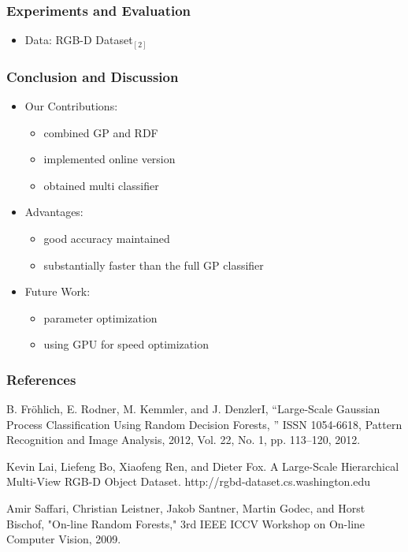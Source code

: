 \documentclass[mathserif]{beamer}
\begin{document}
\begin{frame}
\frametitle{Experiments and Evaluation}
\begin{itemize}
\item Data: RGB-D Dataset$_{[2]}$ 
\end{itemize}

\end{frame}
\begin{frame}
\frametitle{Conclusion and Discussion}
\begin{itemize}
\item Our Contributions:
\begin{itemize}
\item combined GP and RDF
\item implemented online version
\item obtained multi classifier
\end{itemize}
\end{itemize}

\begin{itemize}
\item Advantages:
\begin{itemize}
\item good accuracy maintained
\item substantially faster than the full GP classifier
\end{itemize}
\end{itemize}


\begin{itemize}
\item Future Work:
\begin{itemize}
\item parameter optimization 
\item using GPU for speed optimization
\end{itemize}
\end{itemize}


\end{frame}
\begin{frame}%
\frametitle{References}
\fontsize{6}{9}
\begin{thebibliography}{99}
B. Fröhlich, E. Rodner, M. Kemmler, and J. DenzlerI,	 “Large-Scale Gaussian Process Classification Using Random Decision Forests, ” ISSN 1054-6618, Pattern Recognition and Image Analysis, 2012, Vol. 22, No. 1, pp. 113–120, 2012. 

Kevin Lai, Liefeng Bo, Xiaofeng Ren, and Dieter Fox.  A Large-Scale Hierarchical Multi-View RGB-D Object Dataset. http://rgbd-dataset.cs.washington.edu

Amir Saffari, Christian Leistner, Jakob Santner, Martin Godec, and Horst Bischof, "On-line Random Forests," 3rd IEEE ICCV Workshop on On-line Computer Vision, 2009.
\end{thebibliography}
\end{frame}
\end{document}
